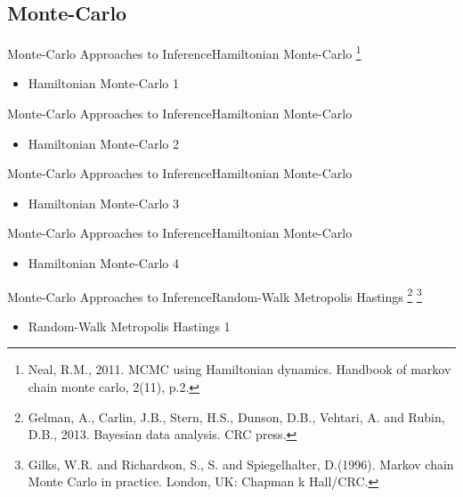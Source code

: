 \documentclass[AERbeamer%
              ,optEnglish%
              ,optBiber%
              ,optBibstyleAlphabetic%
              ,optBeamerClassicFormat%
              ]{AERlatex}%
\begin{document}
\subsection{Monte-Carlo}

\begin{frame}[c]{Monte-Carlo Approaches to Inference}{Hamiltonian Monte-Carlo \footnote{Neal, R.M., 2011. MCMC using Hamiltonian dynamics. Handbook of markov chain monte carlo, 2(11), p.2.}}
    \centering
    \begin{itemize}
        \item Hamiltonian Monte-Carlo 1
    \end{itemize}
\end{frame}


\begin{frame}[c]{Monte-Carlo Approaches to Inference}{Hamiltonian Monte-Carlo}
    \centering
    \begin{itemize}
        \item Hamiltonian Monte-Carlo 2
    \end{itemize}
\end{frame}


\begin{frame}[c]{Monte-Carlo Approaches to Inference}{Hamiltonian Monte-Carlo}
    \centering
    \begin{itemize}
        \item Hamiltonian Monte-Carlo 3
    \end{itemize}
\end{frame}


\begin{frame}[c]{Monte-Carlo Approaches to Inference}{Hamiltonian Monte-Carlo}
    \centering
    \begin{itemize}
        \item Hamiltonian Monte-Carlo 4
    \end{itemize}
\end{frame}



\begin{frame}[c]{Monte-Carlo Approaches to Inference}{Random-Walk Metropolis Hastings \footnote{Gelman, A., Carlin, J.B., Stern, H.S., Dunson, D.B., Vehtari, A. and Rubin,
                                                                                                D.B., 2013. Bayesian data analysis. CRC press.}
                                                                                      \footnote{Gilks, W.R. and Richardson, S., S. and Spiegelhalter, D.(1996). Markov chain
                                                                                                Monte Carlo in practice. London, UK: Chapman k Hall/CRC.}}
    \centering
    \begin{itemize}
        \item Random-Walk Metropolis Hastings 1
    \end{itemize}
\end{frame}
\end{document}
